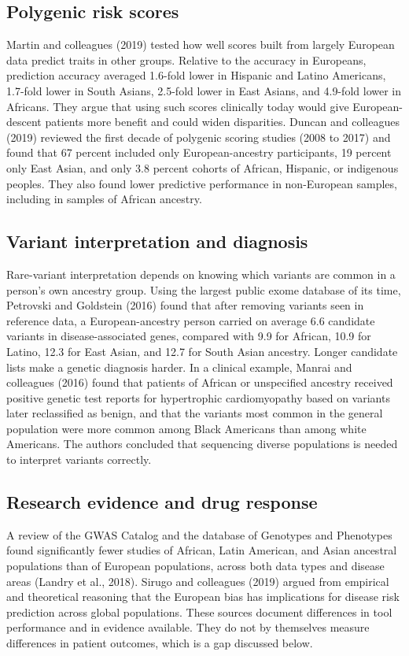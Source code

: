\documentclass[12pt]{article}
\begin{document}
\subsection*{Polygenic risk scores}
Martin and colleagues (2019) tested how well scores built from largely European data predict traits in other groups. Relative to the accuracy in Europeans, prediction accuracy averaged 1.6-fold lower in Hispanic and Latino Americans, 1.7-fold lower in South Asians, 2.5-fold lower in East Asians, and 4.9-fold lower in Africans. They argue that using such scores clinically today would give European-descent patients more benefit and could widen disparities. Duncan and colleagues (2019) reviewed the first decade of polygenic scoring studies (2008 to 2017) and found that 67 percent included only European-ancestry participants, 19 percent only East Asian, and only 3.8 percent cohorts of African, Hispanic, or indigenous peoples. They also found lower predictive performance in non-European samples, including in samples of African ancestry.

\subsection*{Variant interpretation and diagnosis}
Rare-variant interpretation depends on knowing which variants are common in a person's own ancestry group. Using the largest public exome database of its time, Petrovski and Goldstein (2016) found that after removing variants seen in reference data, a European-ancestry person carried on average 6.6 candidate variants in disease-associated genes, compared with 9.9 for African, 10.9 for Latino, 12.3 for East Asian, and 12.7 for South Asian ancestry. Longer candidate lists make a genetic diagnosis harder. In a clinical example, Manrai and colleagues (2016) found that patients of African or unspecified ancestry received positive genetic test reports for hypertrophic cardiomyopathy based on variants later reclassified as benign, and that the variants most common in the general population were more common among Black Americans than among white Americans. The authors concluded that sequencing diverse populations is needed to interpret variants correctly.

\subsection*{Research evidence and drug response}
A review of the GWAS Catalog and the database of Genotypes and Phenotypes found significantly fewer studies of African, Latin American, and Asian ancestral populations than of European populations, across both data types and disease areas (Landry et al., 2018). Sirugo and colleagues (2019) argued from empirical and theoretical reasoning that the European bias has implications for disease risk prediction across global populations. These sources document differences in tool performance and in evidence available. They do not by themselves measure differences in patient outcomes, which is a gap discussed below.
\end{document}
